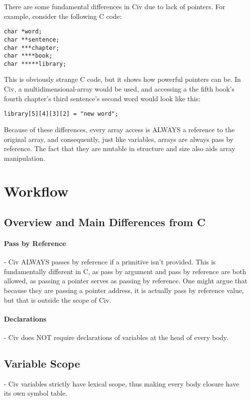 \documentclass[a4paper]{article}
\begin{document}
There are some fundamental differences in Civ due to lack of pointers. For example, consider the following C code:
\begin{lstlisting}
char *word;
char **sentence;
char ***chapter;
char ****book;
char *****library;
\end{lstlisting}

This is obviously strange C code, but it shows how powerful pointers can be. In Civ, a multidimensional-array would be used, and accessing a the fifth book's fourth chapter's third sentence's second word would look like this:

\begin{lstlisting}
library[5][4][3][2] = "new word";
\end{lstlisting}

Because of these differences, every array access is ALWAYS a reference to the original array, and consequently, just like variables, arrays are always pass by reference. The fact that they are mutable in structure and size also aids array manipulation.

\section{Workflow}
\subsection{Overview and Main Differences from C}

\paragraph{Pass by Reference} - Civ ALWAYS passes by reference if a primitive isn't provided. This is fundamentally different in C, as pass by argument and pass by reference are both allowed, as passing a pointer serves as passing by reference. One might argue that because they are passing a pointer address, it is actually pass by reference value, but that is outside the scope of Civ.

\paragraph{Declarations} - Civ does NOT require declarations of variables at the head of every body.

\subsection{Variable Scope} - Civ variables strictly have lexical scope, thus making every body closure have its own symbol table.
\end{document}
